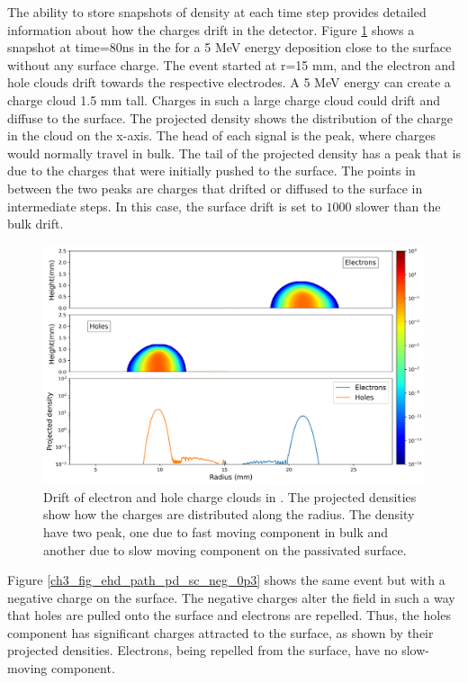 The ability to store snapshots of density at each time step provides detailed information about how the charges drift in the detector. Figure \ref{ch3_fig_ehd_path_pd_sc_0} shows a snapshot at time=$80$ns in the {\ehd} for a 5 MeV energy deposition close to the surface without any surface charge. The event started at r=15 mm, and the electron and hole clouds drift towards the respective electrodes.  A 5 MeV energy can create a charge cloud 1.5 mm tall. Charges in such a large charge cloud could drift and diffuse to the surface. The projected density shows the distribution of the charge in the cloud on the x-axis. The head of each signal is the peak, where charges would normally travel in bulk. The tail of the projected density has a peak that is due to the charges that were initially pushed to the surface. The points in between the two peaks are charges that drifted or diffused to the surface in intermediate steps. In this case, the surface drift is set to $1000$ slower than the bulk drift. 

\begin{figure}%
    \includegraphics[trim={0cm 0 0cm 0},clip,width=0.99\linewidth]{ch3/figs/drift_path_sc=0.0.png}
    \caption{Drift of electron and hole charge clouds in {\ehd}. The projected densities show how the charges are distributed along the radius. The density have two peak, one due to fast moving component in bulk and another due to slow moving component on the passivated surface.}
    \label{ch3_fig_ehd_path_pd_sc_0}
\end{figure}

Figure \ref{ch3_fig_ehd_path_pd_sc_neg_0p3} shows the same event but with a negative charge on the surface. The negative charges alter the field in such a way that holes are pulled onto the surface and electrons are repelled. Thus, the holes component has significant charges attracted to the surface, as shown by their projected densities. Electrons, being repelled from the surface, have no slow-moving component.


